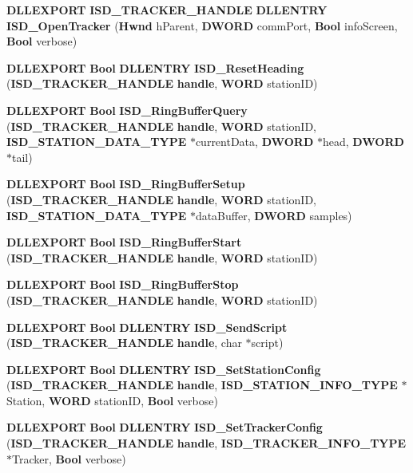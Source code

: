 \begin{DoxyCompactItemize}
{\bf \-D\-L\-L\-E\-X\-P\-O\-R\-T} {\bf \-I\-S\-D\-\_\-\-T\-R\-A\-C\-K\-E\-R\-\_\-\-H\-A\-N\-D\-L\-E} \*
{\bf \-D\-L\-L\-E\-N\-T\-R\-Y} {\bf \-I\-S\-D\-\_\-\-Open\-Tracker} ({\bf \-Hwnd} h\-Parent, {\bf \-D\-W\-O\-R\-D} comm\-Port, {\bf \-Bool} info\-Screen, {\bf \-Bool} verbose)
\item 
{\bf \-D\-L\-L\-E\-X\-P\-O\-R\-T} {\bf \-Bool} {\bf \-D\-L\-L\-E\-N\-T\-R\-Y} {\bf \-I\-S\-D\-\_\-\-Reset\-Heading} ({\bf \-I\-S\-D\-\_\-\-T\-R\-A\-C\-K\-E\-R\-\_\-\-H\-A\-N\-D\-L\-E} {\bf handle}, {\bf \-W\-O\-R\-D} station\-I\-D)
\item 
{\bf \-D\-L\-L\-E\-X\-P\-O\-R\-T} {\bf \-Bool} {\bf \-I\-S\-D\-\_\-\-Ring\-Buffer\-Query} ({\bf \-I\-S\-D\-\_\-\-T\-R\-A\-C\-K\-E\-R\-\_\-\-H\-A\-N\-D\-L\-E} {\bf handle}, {\bf \-W\-O\-R\-D} station\-I\-D, {\bf \-I\-S\-D\-\_\-\-S\-T\-A\-T\-I\-O\-N\-\_\-\-D\-A\-T\-A\-\_\-\-T\-Y\-P\-E} $\ast$current\-Data, {\bf \-D\-W\-O\-R\-D} $\ast$head, {\bf \-D\-W\-O\-R\-D} $\ast$tail)
\item 
{\bf \-D\-L\-L\-E\-X\-P\-O\-R\-T} {\bf \-Bool} {\bf \-I\-S\-D\-\_\-\-Ring\-Buffer\-Setup} ({\bf \-I\-S\-D\-\_\-\-T\-R\-A\-C\-K\-E\-R\-\_\-\-H\-A\-N\-D\-L\-E} {\bf handle}, {\bf \-W\-O\-R\-D} station\-I\-D, {\bf \-I\-S\-D\-\_\-\-S\-T\-A\-T\-I\-O\-N\-\_\-\-D\-A\-T\-A\-\_\-\-T\-Y\-P\-E} $\ast$data\-Buffer, {\bf \-D\-W\-O\-R\-D} samples)
\item 
{\bf \-D\-L\-L\-E\-X\-P\-O\-R\-T} {\bf \-Bool} {\bf \-I\-S\-D\-\_\-\-Ring\-Buffer\-Start} ({\bf \-I\-S\-D\-\_\-\-T\-R\-A\-C\-K\-E\-R\-\_\-\-H\-A\-N\-D\-L\-E} {\bf handle}, {\bf \-W\-O\-R\-D} station\-I\-D)
\item 
{\bf \-D\-L\-L\-E\-X\-P\-O\-R\-T} {\bf \-Bool} {\bf \-I\-S\-D\-\_\-\-Ring\-Buffer\-Stop} ({\bf \-I\-S\-D\-\_\-\-T\-R\-A\-C\-K\-E\-R\-\_\-\-H\-A\-N\-D\-L\-E} {\bf handle}, {\bf \-W\-O\-R\-D} station\-I\-D)
\item 
{\bf \-D\-L\-L\-E\-X\-P\-O\-R\-T} {\bf \-Bool} {\bf \-D\-L\-L\-E\-N\-T\-R\-Y} {\bf \-I\-S\-D\-\_\-\-Send\-Script} ({\bf \-I\-S\-D\-\_\-\-T\-R\-A\-C\-K\-E\-R\-\_\-\-H\-A\-N\-D\-L\-E} {\bf handle}, char $\ast$script)
\item 
{\bf \-D\-L\-L\-E\-X\-P\-O\-R\-T} {\bf \-Bool} {\bf \-D\-L\-L\-E\-N\-T\-R\-Y} {\bf \-I\-S\-D\-\_\-\-Set\-Station\-Config} ({\bf \-I\-S\-D\-\_\-\-T\-R\-A\-C\-K\-E\-R\-\_\-\-H\-A\-N\-D\-L\-E} {\bf handle}, {\bf \-I\-S\-D\-\_\-\-S\-T\-A\-T\-I\-O\-N\-\_\-\-I\-N\-F\-O\-\_\-\-T\-Y\-P\-E} $\ast$\-Station, {\bf \-W\-O\-R\-D} station\-I\-D, {\bf \-Bool} verbose)
\item 
{\bf \-D\-L\-L\-E\-X\-P\-O\-R\-T} {\bf \-Bool} {\bf \-D\-L\-L\-E\-N\-T\-R\-Y} {\bf \-I\-S\-D\-\_\-\-Set\-Tracker\-Config} ({\bf \-I\-S\-D\-\_\-\-T\-R\-A\-C\-K\-E\-R\-\_\-\-H\-A\-N\-D\-L\-E} {\bf handle}, {\bf \-I\-S\-D\-\_\-\-T\-R\-A\-C\-K\-E\-R\-\_\-\-I\-N\-F\-O\-\_\-\-T\-Y\-P\-E} $\ast$\-Tracker, {\bf \-Bool} verbose)

\end{DoxyCompactItemize}
